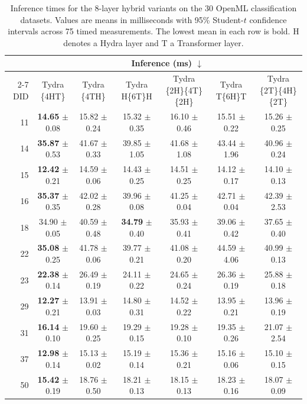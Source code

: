 \begin{table}[t]
\centering
\caption{Inference times for the 8-layer hybrid variants on the 30 OpenML classification datasets. Values are means in milliseconds with 95\% Student-$t$ confidence intervals across 75 timed measurements. The lowest mean in each row is bold. $\mathrm{H}$ denotes a Hydra layer and $\mathrm{T}$ a Transformer layer.}
\label{tab:hybrid_variants_inference}
\setlength{\tabcolsep}{4pt}
\renewcommand{\arraystretch}{1.04}
\scriptsize
\begin{tabular*}{\textwidth}{@{\extracolsep{\fill}}rcccccc@{}}
\toprule
& \multicolumn{6}{c}{Inference (ms) $\downarrow$} \\
\cmidrule(lr){2-7}
DID & Tydra \{4HT\} & Tydra \{4TH\} & Tydra H\{6T\}H & Tydra \{2H\}\{4T\}\{2H\} & Tydra T\{6H\}T & Tydra \{2T\}\{4H\}\{2T\} \\
\midrule
11 & \textbf{14.65} $\pm$ 0.08 & 15.82 $\pm$ 0.24 & 15.32 $\pm$ 0.35 & 16.10 $\pm$ 0.46 & 15.51 $\pm$ 0.22 & 15.26 $\pm$ 0.25 \\
14 & \textbf{35.87} $\pm$ 0.53 & 41.67 $\pm$ 0.33 & 39.85 $\pm$ 1.05 & 41.68 $\pm$ 1.08 & 43.44 $\pm$ 1.96 & 40.96 $\pm$ 0.24 \\
15 & \textbf{12.42} $\pm$ 0.21 & 14.59 $\pm$ 0.06 & 14.43 $\pm$ 0.25 & 14.51 $\pm$ 0.25 & 14.12 $\pm$ 0.17 & 14.10 $\pm$ 0.13 \\
16 & \textbf{35.37} $\pm$ 0.35 & 42.02 $\pm$ 0.28 & 39.96 $\pm$ 0.08 & 41.25 $\pm$ 0.04 & 42.71 $\pm$ 0.04 & 42.39 $\pm$ 2.53 \\
18 & 34.90 $\pm$ 0.05 & 40.59 $\pm$ 0.48 & \textbf{34.79} $\pm$ 0.40 & 35.93 $\pm$ 0.41 & 39.06 $\pm$ 0.42 & 37.65 $\pm$ 0.40 \\
22 & \textbf{35.08} $\pm$ 0.25 & 41.78 $\pm$ 0.06 & 39.77 $\pm$ 0.21 & 41.08 $\pm$ 0.20 & 44.59 $\pm$ 4.06 & 40.99 $\pm$ 0.13 \\
23 & \textbf{22.38} $\pm$ 0.14 & 26.49 $\pm$ 0.19 & 24.11 $\pm$ 0.22 & 24.65 $\pm$ 0.24 & 26.36 $\pm$ 0.19 & 25.88 $\pm$ 0.18 \\
29 & \textbf{12.27} $\pm$ 0.21 & 13.91 $\pm$ 0.03 & 14.80 $\pm$ 0.31 & 14.52 $\pm$ 0.22 & 13.95 $\pm$ 0.21 & 13.96 $\pm$ 0.19 \\
31 & \textbf{16.14} $\pm$ 0.10 & 19.60 $\pm$ 0.25 & 19.29 $\pm$ 0.15 & 19.28 $\pm$ 0.10 & 19.35 $\pm$ 0.26 & 21.07 $\pm$ 2.54 \\
37 & \textbf{12.98} $\pm$ 0.14 & 15.13 $\pm$ 0.02 & 15.19 $\pm$ 0.14 & 15.36 $\pm$ 0.21 & 15.16 $\pm$ 0.06 & 15.10 $\pm$ 0.15 \\
50 & \textbf{15.42} $\pm$ 0.19 & 18.76 $\pm$ 0.50 & 18.21 $\pm$ 0.13 & 18.15 $\pm$ 0.13 & 18.23 $\pm$ 0.16 & 18.07 $\pm$ 0.09 \\

\end{tabular*}
\end{table}

